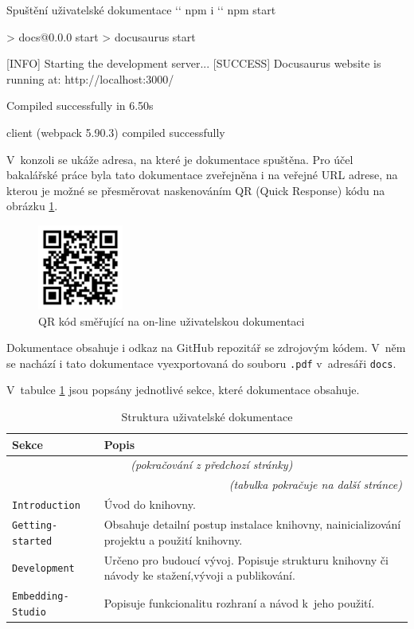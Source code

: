\documentclass[czech, bc, kiv, he, iso690numb]{fasthesis}
\begin{document}
\begin{console}{Spuštění uživatelské dokumentace}
`\winprompt` npm i
`\winprompt` npm start

> docs@0.0.0 start
> docusaurus start

[INFO] Starting the development server...
[SUCCESS] Docusaurus website is running at: http://localhost:3000/

 Compiled successfully in 6.50s

client (webpack 5.90.3) compiled successfully
\end{console}

V~konzoli se ukáže adresa, na které je dokumentace spuštěna. Pro účel bakalářské práce byla tato dokumentace
zveřejněna i na veřejné URL adrese, na kterou je možné se přesměrovat naskenováním QR (Quick Response) kódu na obrázku \ref{fig:qrCode}.

\begin{figure}[h]
	\centering
	\includegraphics[width=0.25\textwidth]{pictures/QR.pdf}
	\caption{QR kód směřující na on-line uživatelskou dokumentaci}
	\label{fig:qrCode}
\end{figure}

Dokumentace obsahuje i odkaz na GitHub repozitář se zdrojovým kódem. V~něm se nachází i tato dokumentace vyexportovaná do souboru \texttt{.pdf} v~adresáři \texttt{docs}. 


V~tabulce \ref{tab:docsTabs} jsou popsány jednotlivé sekce, které dokumentace obsahuje.

	\begin{longtable}{p{}p{}}
	\caption{Struktura uživatelské dokumentace}
	\label{tab:docsTabs}\\
	\toprule[1.5pt]
	\textbf{Sekce} & \textbf{Popis}\\
	\midrule
	\endfirsthead
	\multicolumn{2}{c}{\tablename{}~\thetable{} \textit{(pokračování z předchozí stránky)}}\\
	\endhead
	\midrule
	\multicolumn{2}{r}{\textit{(tabulka pokračuje na další stránce)}}\\
	\endfoot
	\bottomrule[1.5pt]
	\endlastfoot
	\verb"Introduction" & Úvod do knihovny. \\
	\midrule
	\verb"Getting-started" & Obsahuje detailní postup instalace knihovny, nainicializování projektu a použití knihovny. \\
	\midrule
	\verb"Development" & Určeno pro budoucí vývoj. Popisuje strukturu knihovny či návody ke stažení,vývoji a publikování.\\
	\midrule
	\verb"Embedding-Studio" & Popisuje funkcionalitu rozhraní a návod k~jeho použití. \\
	\end{longtable}
\end{document}
